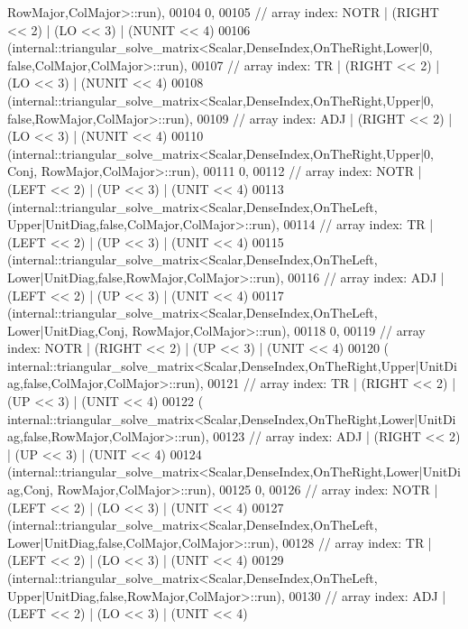 \begin{DoxyCode}
       RowMajor,ColMajor>::run),
00104     0,
00105     \textcolor{comment}{// array index: NOTR  | (RIGHT << 2) | (LO << 3) | (NUNIT << 4)}
00106     (internal::triangular\_solve\_matrix<Scalar,DenseIndex,OnTheRight,Lower|0,         
       false,ColMajor,ColMajor>::run),
00107     \textcolor{comment}{// array index: TR    | (RIGHT << 2) | (LO << 3) | (NUNIT << 4)}
00108     (internal::triangular\_solve\_matrix<Scalar,DenseIndex,OnTheRight,Upper|0,         
       false,RowMajor,ColMajor>::run),
00109     \textcolor{comment}{// array index: ADJ   | (RIGHT << 2) | (LO << 3) | (NUNIT << 4)}
00110     (internal::triangular\_solve\_matrix<Scalar,DenseIndex,OnTheRight,Upper|0,          Conj,
       RowMajor,ColMajor>::run),
00111     0,
00112     \textcolor{comment}{// array index: NOTR  | (LEFT  << 2) | (UP << 3) | (UNIT  << 4)}
00113     (internal::triangular\_solve\_matrix<Scalar,DenseIndex,OnTheLeft,
       Upper|UnitDiag,false,ColMajor,ColMajor>::run),
00114     \textcolor{comment}{// array index: TR    | (LEFT  << 2) | (UP << 3) | (UNIT  << 4)}
00115     (internal::triangular\_solve\_matrix<Scalar,DenseIndex,OnTheLeft,
       Lower|UnitDiag,false,RowMajor,ColMajor>::run),
00116     \textcolor{comment}{// array index: ADJ   | (LEFT  << 2) | (UP << 3) | (UNIT  << 4)}
00117     (internal::triangular\_solve\_matrix<Scalar,DenseIndex,OnTheLeft, Lower|UnitDiag,Conj,
       RowMajor,ColMajor>::run),
00118     0,
00119     \textcolor{comment}{// array index: NOTR  | (RIGHT << 2) | (UP << 3) | (UNIT  << 4)}
00120     (
      internal::triangular\_solve\_matrix<Scalar,DenseIndex,OnTheRight,Upper|UnitDiag,false,ColMajor,ColMajor>::run),
00121     \textcolor{comment}{// array index: TR    | (RIGHT << 2) | (UP << 3) | (UNIT  << 4)}
00122     (
      internal::triangular\_solve\_matrix<Scalar,DenseIndex,OnTheRight,Lower|UnitDiag,false,RowMajor,ColMajor>::run),
00123     \textcolor{comment}{// array index: ADJ   | (RIGHT << 2) | (UP << 3) | (UNIT  << 4)}
00124     (internal::triangular\_solve\_matrix<Scalar,DenseIndex,OnTheRight,Lower|UnitDiag,Conj,
       RowMajor,ColMajor>::run),
00125     0,
00126     \textcolor{comment}{// array index: NOTR  | (LEFT  << 2) | (LO << 3) | (UNIT  << 4)}
00127     (internal::triangular\_solve\_matrix<Scalar,DenseIndex,OnTheLeft,
       Lower|UnitDiag,false,ColMajor,ColMajor>::run),
00128     \textcolor{comment}{// array index: TR    | (LEFT  << 2) | (LO << 3) | (UNIT  << 4)}
00129     (internal::triangular\_solve\_matrix<Scalar,DenseIndex,OnTheLeft,
       Upper|UnitDiag,false,RowMajor,ColMajor>::run),
00130     \textcolor{comment}{// array index: ADJ   | (LEFT  << 2) | (LO << 3) | (UNIT  << 4)}

\end{DoxyCode}
